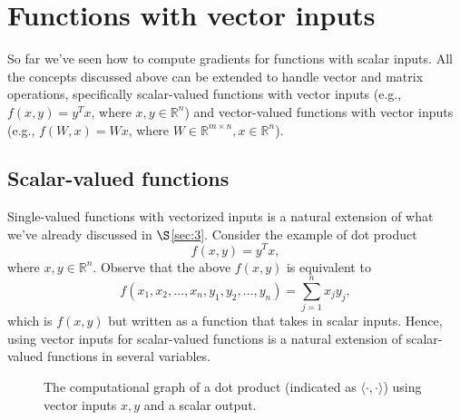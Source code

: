 \section{Functions with vector inputs}
\label{sec:4}

So far we've seen how to compute gradients for functions with scalar inputs. All the concepts discussed above can be extended to handle vector and matrix operations, specifically scalar-valued functions with vector inputs (e.g., $f(x, y) = y^Tx$, where $x,y \in \mathbb{R}^n$) and vector-valued functions with vector inputs (e.g., $f(W, x) = Wx$, where $W \in \mathbb{R}^{m \times n}, x \in \mathbb{R}^n$).

\subsection{Scalar-valued functions}
\label{sec:4.1}

Single-valued functions with vectorized inputs is a natural extension of what we've already discussed in $\S$\ref{sec:3}. Consider the example of dot product
$$
f(x, y) =  y^T x,
$$
where $x, y \in \mathbb{R}^n$. Observe that the above $f(x, y)$ is equivalent to
$$
f(x_1, x_2, \dotsc, x_n, y_1,  y_2, \dotsc, y_n) = \sum_{j=1}^n x_j y_j,
$$
which is $f(x, y)$ but written as a function that takes in scalar inputs. Hence, using vector inputs for scalar-valued functions is a natural extension of scalar-valued functions in several variables. 

\begin{figure}[!t]
\centering
{}
\caption{The computational graph of a dot product (indicated as $\langle \cdot, \cdot \rangle$) using vector inputs $x, y$ and a scalar output.}
\label{fig:9}
\end{figure}

